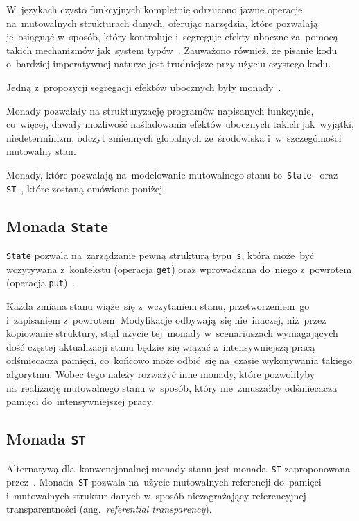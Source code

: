 \documentclass[../../praca.tex]{subfiles}
\begin{document}
W~językach czysto funkcyjnych kompletnie odrzucono
jawne operacje na~mutowalnych strukturach danych, oferując narzędzia,
które pozwalają je~osiągnąć w~sposób, który kontroluje i~segreguje
efekty uboczne za~pomocą takich mechanizmów jak~system typów~\cite{Hudak:Conception}.
Zauważono również, że pisanie kodu o~bardziej imperatywnej naturze jest
trudniejsze przy użyciu czystego kodu.

Jedną z~propozycji segregacji efektów ubocznych były monady~\cite{Wadler:MFP}.

Monady pozwalały na strukturyzację programów napisanych funkcyjnie, co~więcej,
dawały możliwość naśladowania efektów ubocznych takich jak~wyjątki,
niedeterminizm, odczyt zmiennych globalnych ze~środowiska i~w~szczególności
mutowalny stan.

Monady, które pozwalają na~modelowanie mutowalnego stanu to~\texttt{State}~\cite{OSullivan:RWH}
oraz \texttt{ST}~\cite{Launchbury:LFST}, które zostaną omówione poniżej.

\subsection{Monada \texttt{State}}

\texttt{State} pozwala na~zarządzanie pewną strukturą typu~\texttt{s}, która
może~być wczytywana z~kontekstu (operacja \texttt{get}) oraz wprowadzana do~niego z~powrotem
(operacja \texttt{put})~\cite{OSullivan:RWH}.

Każda zmiana stanu wiąże~się z~wczytaniem stanu, przetworzeniem~go i~zapisaniem z~powrotem.
Modyfikacje odbywają~się nie~inaczej, niż~przez kopiowanie struktury, stąd użycie tej~monady
w~scenariuszach wymagających dość częstej aktualizacji stanu będzie~się wiązać z~intensywniejszą
pracą odśmiecacza pamięci, co~końcowo może odbić~się na~czasie wykonywania takiego algorytmu.
Wobec tego należy rozważyć inne monady, które pozwoliłyby na~realizację mutowalnego stanu
w~sposób, który nie~zmuszałby odśmiecacza pamięci do~intensywniejszej pracy.

\subsection{Monada \texttt{ST}}

Alternatywą dla~konwencjonalnej monady stanu jest monada~\texttt{ST} zaproponowana
przez~\cite{Launchbury:LFST}. Monada~\texttt{ST} pozwala na~użycie mutowalnych
referencji do~pamięci i~mutowalnych struktur danych w~sposób niezagrażający
referencyjnej transparentności (ang.~\emph{referential transparency}).
\end{document}
